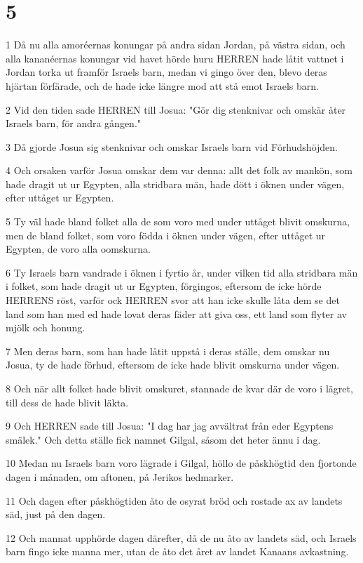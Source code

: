\chapter{5}

\par 1 Då nu alla amoréernas konungar på andra sidan Jordan, på västra sidan, och alla kananéernas konungar vid havet hörde huru HERREN hade låtit vattnet i Jordan torka ut framför Israels barn, medan vi gingo över den, blevo deras hjärtan förfärade, och de hade icke längre mod att stå emot Israels barn.
\par 2 Vid den tiden sade HERREN till Josua: "Gör dig stenknivar och omskär åter Israels barn, för andra gången."
\par 3 Då gjorde Josua sig stenknivar och omskar Israels barn vid Förhudshöjden.
\par 4 Och orsaken varför Josua omskar dem var denna: allt det folk av mankön, som hade dragit ut ur Egypten, alla stridbara män, hade dött i öknen under vägen, efter uttåget ur Egypten.
\par 5 Ty väl hade bland folket alla de som voro med under uttåget blivit omskurna, men de bland folket, som voro födda i öknen under vägen, efter uttåget ur Egypten, de voro alla oomskurna.
\par 6 Ty Israels barn vandrade i öknen i fyrtio år, under vilken tid alla stridbara män i folket, som hade dragit ut ur Egypten, förgingos, eftersom de icke hörde HERRENS röst, varför ock HERREN svor att han icke skulle låta dem se det land som han med ed hade lovat deras fäder att giva oss, ett land som flyter av mjölk och honung.
\par 7 Men deras barn, som han hade låtit uppstå i deras ställe, dem omskar nu Josua, ty de hade förhud, eftersom de icke hade blivit omskurna under vägen.
\par 8 Och när allt folket hade blivit omskuret, stannade de kvar där de voro i lägret, till dess de hade blivit läkta.
\par 9 Och HERREN sade till Josua: "I dag har jag avvältrat från eder Egyptens smälek." Och detta ställe fick namnet Gilgal, såsom det heter ännu i dag.
\par 10 Medan nu Israels barn voro lägrade i Gilgal, höllo de påskhögtid den fjortonde dagen i månaden, om aftonen, på Jerikos hedmarker.
\par 11 Och dagen efter påskhögtiden åto de osyrat bröd och rostade ax av landets säd, just på den dagen.
\par 12 Och mannat upphörde dagen därefter, då de nu åto av landets säd, och Israels barn fingo icke manna mer, utan de åto det året av landet Kanaans avkastning.
